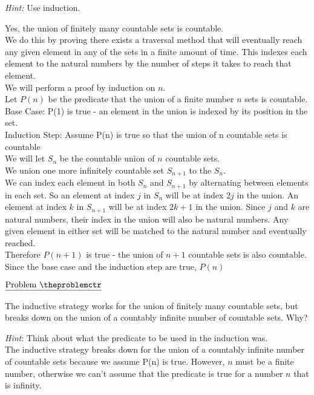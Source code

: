 \documentclass[11pt]{article}
\def\pp{\par\noindent}
\begin{document}
\smallskip
\noindent
\emph{Hint:} Use induction.

Yes, the union of finitely many countable sets is countable.\\
We do this by proving there exists a traversal method that will eventually reach any given element in any of the sets in a finite amount of time. This indexes each element to the natural numbers by the number of steps it takes to reach that element.\\

We will perform a proof by induction on $n$.\\
Let $P(n)$ be the predicate that the union of a finite number $n$ sets is countable.\\
Base Case: P(1) is true - an element in the union is indexed by its position in the set.\\
Induction Step: Assume P(n) is true so that the union of n countable sets is countable\\
We will let $S_n$ be the countable union of $n$ countable sets.\\
We union one more infinitely countable set $S_{n+1}$ to the $S_{n}$.\\
We can index each element in both $S_n$ and $S_{n+1}$ by alternating between elements in each set. So an element at index $j$ in $S_n$ will be at index $2j$ in the union. An element at index $k$ in $S_{n+1}$ will be at index $2k+1$ in the union. Since $j$ and $k$ are natural numbers, their index in the union will also be natural numbers. Any given element in either set will be matched to the natural number and eventually reached.\\
Therefore $P(n+1)$ is true - the union of $n+1$ countable sets is also countable.\\
Since the base case and the induction step are true, $P(n)$\\

\addtocounter{problemctr}{1}
\bigskip
\noindent
$\underline{\rm Problem\ \theproblemctr}$ \pp
The inductive strategy works for the union of finitely many countable sets, but breaks down on the union of a countably infinite number of countable sets. Why?

\smallskip
\noindent
\emph{Hint}: Think about what the predicate to be used in the induction was.\\

The inductive strategy breaks down for the union of a countably infinite number of countable sets because we assume P(n) is true. However, $n$ must be a finite number, otherwise we can't assume that the predicate is true for a number $n$ that is infinity.
\end{document}

